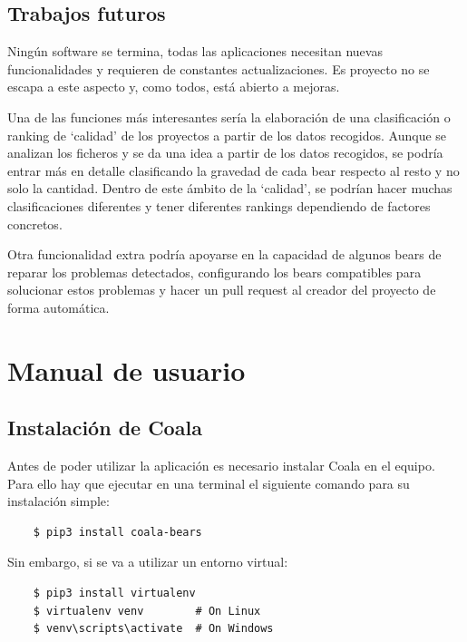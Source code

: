 \documentclass[a4paper, 12pt]{book}
\begin{document}
\section{Trabajos futuros}
\label{sec:trabajos_futuros}
Ningún software se termina, todas las aplicaciones necesitan nuevas funcionalidades y requieren de constantes actualizaciones. Es proyecto no se escapa a este aspecto y, como todos, está abierto a mejoras.

Una de las funciones más interesantes sería la elaboración de una clasificación o ranking de `calidad' de los proyectos a partir de los datos recogidos. Aunque se analizan los ficheros y se da una idea a partir de los datos recogidos, se podría entrar más en detalle clasificando la gravedad de cada bear respecto al resto y no solo la cantidad. Dentro de este ámbito de la `calidad', se podrían hacer muchas clasificaciones diferentes y tener diferentes rankings dependiendo de factores concretos.

Otra funcionalidad extra podría apoyarse en la capacidad de algunos bears de reparar los problemas detectados, configurando los bears compatibles para solucionar estos problemas y hacer un pull request al creador del proyecto de forma automática.


\cleardoublepage
\appendix
\chapter{Manual de usuario}
\label{app:manual}

\section{Instalación de Coala}
\label{app:inst_coala}
Antes de poder utilizar la aplicación es necesario instalar Coala en el equipo. Para ello hay que ejecutar en una terminal el siguiente comando para su instalación simple:
{\footnotesize
\begin{verbatim}
    $ pip3 install coala-bears
\end{verbatim}
}

Sin embargo, si se va a utilizar un entorno virtual:
{\footnotesize
\begin{verbatim}
    $ pip3 install virtualenv
    $ virtualenv venv        # On Linux
    $ venv\scripts\activate  # On Windows
\end{verbatim}
}
\end{document}
